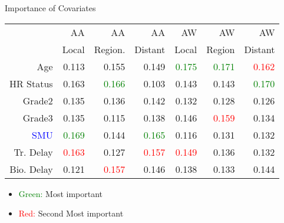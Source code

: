 \documentclass{beamer}
\begin{document}
\begin{frame}{Importance of Covariates}
\protect\hypertarget{importance-of-covariates}{}
\renewcommand{\arraystretch}{1.2}
\begin{table}[ht]
\centering

\begin{tabular}{rrrrrrr}
  \hline
& AA & AA  & AA & AW & AW & AW \\ 
 & Local & Region.  & Distant & Local & Region  & Distant \\
  \hline
Age & 0.113 & 0.155 & 0.149 & \textcolor{green}{0.175} & \textcolor{green}{0.171} & \textcolor{red}{0.162} \\ 
  HR Status & 0.163 & \textcolor{green}{0.166} & 0.103 & 0.143 & 0.143 & \textcolor{green}{0.170} \\ 
  Grade2 & 0.135 & 0.136 & 0.142 & 0.132 & 0.128 & 0.126 \\ 
  Grade3 & 0.135 & 0.115 & 0.138 & 0.146 & \textcolor{red}{0.159} & 0.134 \\ 
  \textcolor{blue}{SMU}  & \textcolor{green}{0.169} & 0.144 & \textcolor{green}{0.165} & 0.116 & 0.131 & 0.132 \\ 
  Tr. Delay & \textcolor{red}{0.163} & 0.127 & \textcolor{red}{0.157} & \textcolor{red}{0.149} & 0.136 & 0.132 \\ 
  Bio. Delay & 0.121 &\textcolor{red}{0.157} & 0.146 & 0.138 & 0.133 & 0.144 \\ 
   \hline
   

\end{tabular}


\end{table}
\begin{itemize}
    \item \textcolor{green}{Green:} Most important
    \item \textcolor{red}{Red:} Second Most important
\end{itemize}
%

\end{frame}
\end{document}

